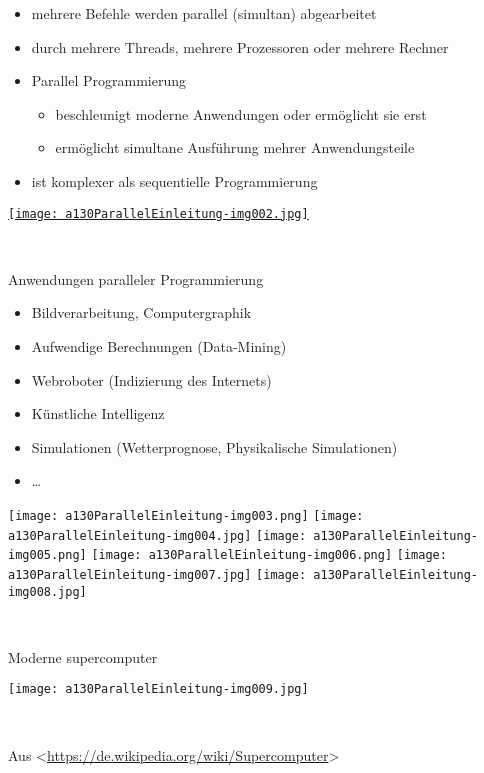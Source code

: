 \begin{itemize}
\item mehrere Befehle werden parallel (simultan) abgearbeitet
\item durch mehrere Threads, mehrere Prozessoren oder mehrere Rechner
\item Parallel Programmierung

\begin{itemize}
\item beschleunigt moderne Anwendungen oder ermöglicht sie erst
\item ermöglicht simultane Ausführung mehrer Anwendungsteile
\end{itemize}
\item ist komplexer als sequentielle Programmierung
\end{itemize}
\href{https://www.google.de/url?sa=i&rct=j&q=&esrc=s&source=images&cd=&cad=rja&uact=8&ved=0ahUKEwjLtLGp_v_RAhVHPRoKHXjNA9gQjRwIBw&url=http%3A%2F%2Fjournal.frontiersin.org%2Farticle%2F10.3389%2Ffnhum.2014.00641%2Ffull&psig=AFQjCNHgQ2DVjdUqSOTj0NvUhKtlPXa1pQ&ust=1486625606749381}{ \texttt{[image: a130ParallelEinleitung-img002.jpg]} }

~

Anwendungen paralleler Programmierung

\begin{itemize}
\item Bildverarbeitung, Computergraphik
\item Aufwendige Berechnungen (Data-Mining)
\item Webroboter (Indizierung des Internets)
\item Künstliche Intelligenz
\item Simulationen (Wetterprognose, Physikalische Simulationen)
\item … 
\end{itemize}
 \texttt{[image: a130ParallelEinleitung-img003.png]}  \texttt{[image: a130ParallelEinleitung-img004.jpg]}  \texttt{[image: a130ParallelEinleitung-img005.png]}  \texttt{[image: a130ParallelEinleitung-img006.png]}  \texttt{[image: a130ParallelEinleitung-img007.jpg]}  \texttt{[image: a130ParallelEinleitung-img008.jpg]} 

~

Moderne supercomputer

 \texttt{[image: a130ParallelEinleitung-img009.jpg]} 

~

Aus {\textless}\url{https://de.wikipedia.org/wiki/Supercomputer}{\textgreater} 

